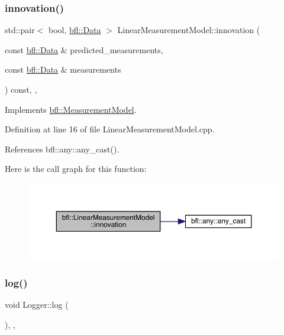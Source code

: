\subsubsection{\texorpdfstring{innovation()}{innovation()}}
{\footnotesize\ttfamily std\+::pair$<$ bool, \mbox{\hyperlink{namespacebfl_af6b103c6821db1b54452f776fdd9dd02}{bfl\+::\+Data}} $>$ Linear\+Measurement\+Model\+::innovation (\begin{DoxyParamCaption}\item[{const \mbox{\hyperlink{namespacebfl_af6b103c6821db1b54452f776fdd9dd02}{bfl\+::\+Data}} \&}]{predicted\+\_\+measurements,  }\item[{const \mbox{\hyperlink{namespacebfl_af6b103c6821db1b54452f776fdd9dd02}{bfl\+::\+Data}} \&}]{measurements }\end{DoxyParamCaption}) const\hspace{0.3cm}{\ttfamily [override]}, {\ttfamily [virtual]}, {\ttfamily [inherited]}}



Implements \mbox{\hyperlink{classbfl_1_1MeasurementModel_aa06e0643805551a981bcc013ad44c829}{bfl\+::\+Measurement\+Model}}.



Definition at line 16 of file Linear\+Measurement\+Model.\+cpp.



References bfl\+::any\+::any\+\_\+cast().

Here is the call graph for this function\+:
\nopagebreak
\begin{figure}[H]
\begin{center}
\leavevmode
\includegraphics[width=350pt]{classbfl_1_1LinearMeasurementModel_a12485b4b6d511e97e338a4db6861b277_cgraph}
\end{center}
\end{figure}
\mbox{\label{classbfl_1_1Logger_ad44f46593cb8c4c87c1178eb326e2f64}} 
\subsubsection{\texorpdfstring{log()}{log()}}
{\footnotesize\ttfamily void Logger\+::log (\begin{DoxyParamCaption}{ }\end{DoxyParamCaption})\hspace{0.3cm}{\ttfamily [protected]}, {\ttfamily [virtual]}, {\ttfamily [inherited]}}



